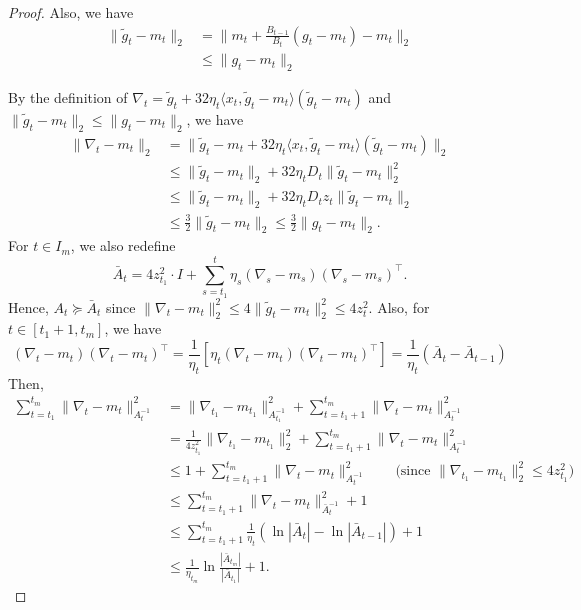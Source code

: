 \documentclass{article}
\theoremstyle{plain}
\theoremstyle{definition}
\theoremstyle{remark}
\renewcommand{\tilde}{\widetilde}
\begin{document}
\begin{proof}
Also, we have
\begin{align*}
\|\tilde{g}_t-m_t\|_2&=\|m_t+\frac{B_{t-1}}{B_t}(g_t-m_t)-m_t\|_2\\
&\leq \|g_t-m_t\|_2
\end{align*}

By the definition of $\nabla_t=\tilde{g}_t+32\eta_t\langle x_t,\tilde{g}_t-m_t\rangle(\tilde{g}_t-m_t)$ and $\|\tilde{g}_t-m_t\|_2\leq \|g_t-m_t\|_2$, we have
\begin{align*}
\|\nabla_t-m_t\|_2&=\|\tilde{g}_t-m_t+32\eta_t\langle x_t,\tilde{g}_t-m_t\rangle(\tilde{g}_t-m_t)\|_2\\
&\leq \|\tilde{g}_t-m_t\|_2+32\eta_tD_t\|\tilde{g}_t-m_t\|_2^2\\
&\leq \|\tilde{g}_t-m_t\|_2+32\eta_tD_t z_t\|\tilde{g}_t-m_t\|_2\\
&\leq \frac{3}{2} \|\tilde{g}_t-m_t\|_2\leq \frac{3}{2} \|g_t-m_t\|_2.
\end{align*}
For $t\in I_m$, we also redefine 
\begin{equation*}
\bar{A}_t=4z_{t_1}^2\cdot I+\sum_{s=t_1}^{t} \eta_s (\nabla_s-m_s)(\nabla_s-m_s)^\top.
\end{equation*}
Hence, $A_t\succeq \bar{A}_t$ since $\|\nabla_t-m_t\|_2^2\leq 4\|\tilde{g}_t-m_t\|_2^2\leq 4z_t^2$. Also, for $t\in[t_1+1,t_m]$, we have
\begin{equation*}
(\nabla_t-m_t)(\nabla_t-m_t)^\top=\frac{1}{\eta_t}[\eta_t(\nabla_t-m_t)(\nabla_t-m_t)^\top]=\frac{1}{\eta_t} (\bar{A}_t-\bar{A}_{t-1})
\end{equation*}
Then,
\begin{align*}
\sum_{t=t_1}^{t_m} \|\nabla_t-m_t\|_{A_t^{-1}}^2&=\|\nabla_{t_1}-m_{t_1}\|_{A_{t_1}^{-1}}^2+\sum_{t=t_1+1}^{t_m} \|\nabla_t-m_t\|_{A_t^{-1}}^2\\
&= \frac{1}{4z_{t_1}^2}\|\nabla_{t_1}-m_{t_1}\|_2^2+\sum_{t=t_1+1}^{t_m} \|\nabla_t-m_t\|_{A_t^{-1}}^2\\
&\leq 1+\sum_{t=t_1+1}^{t_m} \|\nabla_t-m_t\|_{A_t^{-1}}^2 \qquad\text{(since $\|\nabla_{t_1}-m_{t_1}\|_2^2\leq 4z_{t_1}^2$)}\\
&\leq \sum_{t=t_1+1}^{t_m} \|\nabla_t-m_t\|_{\bar{A}_t^{-1}}^2+1\\
&\leq \sum_{t=t_1+1}^{t_m} \frac{1}{\eta_t}(\ln|\bar{A}_t|-\ln|\bar{A}_{t-1}|)+1\\
&\leq \frac{1}{\eta_{t_m}}\ln\frac{|\bar{A}_{t_m}|}{|\bar{A}_{t_1}|}+1.
\end{align*}


\end{proof}
\end{document}
